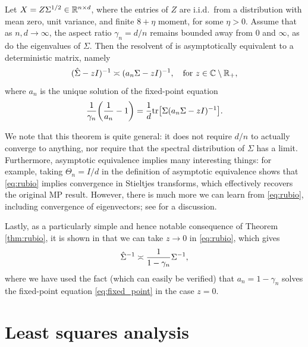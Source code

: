 \documentclass{article}
\begin{document}
\begin{theorem}
\label{thm:rubio}
Let $X = Z \Sigma^{1/2} \in \mathbb{R}^{n \times d}$, where the entries of $Z$ are
i.i.d.\ from a distribution with mean zero, unit variance, and finite $8+\eta$
moment, for some $\eta > 0$. Assume that as $n,d \to \infty$, the aspect ratio
$\gamma_n = d/n$ remains bounded away from $0$ and $\infty$, as do the
eigenvalues of $\Sigma$. Then the resolvent of  is
asymptotically equivalent to a deterministic matrix, namely  
\begin{equation}
\label{eq:rubio}
(\hat\Sigma - zI)^{-1} \asymp (a_n \Sigma - zI)^{-1}, \quad \text{for $z \in \mathbb{C}  
  \setminus \mathbb{R}_+$},
\end{equation}
where $a_n$ is the unique solution of the fixed-point equation
\begin{equation}
\label{eq:fixed_point}
\frac{1}{\gamma_n} \bigg( \frac{1}{a_n} - 1 \bigg) = \frac{1}{d} \mathrm{tr} \big[
\Sigma (a_n \Sigma - zI)^{-1} \big]. 
\end{equation}
\end{theorem}

We note that this theorem is quite general: it does not require $d/n$ to
actually converge to anything, nor require that the spectral distribution of
$\Sigma$ has a limit. Furthermore, asymptotic equivalence implies many
interesting things: for example, taking $\Theta_n = I/d$ in the definition
of asymptotic equivalence shows that \eqref{eq:rubio} implies convergence in 
Stieltjes transforms, which effectively recovers the original MP
result. However, there is much more we can learn from \eqref{eq:rubio},
including convergence of eigenvectors; see \citet{rubio2011spectral} for a
discussion.     

Lastly, as a particularly simple and hence notable consequence of Theorem
\ref{thm:rubio}, it is shown in \citet{dobriban2021distributed} that we can take
$z \to 0$ in \eqref{eq:rubio}, which gives
\begin{equation}
\label{eq:cov_deter_equiv}
\hat\Sigma^{-1} \asymp \frac{1}{1 - \gamma_n} \Sigma^{-1},
\end{equation}
where we have used the fact (which can easily be verified) that $a_n =
1-\gamma_n$ solves the fixed-point equation \eqref{eq:fixed_point} in the case 
$z=0$. 

\section{Least squares analysis}
\end{document}
